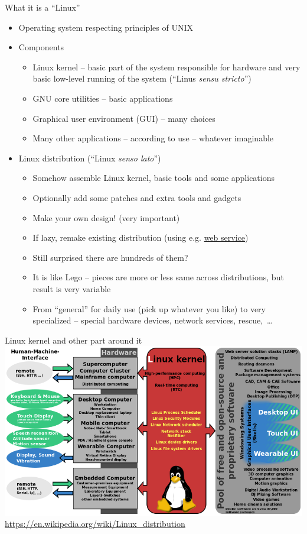 \documentclass[compress, ucs, xelatex, 11pt, xcolor=svgnames,
  hyperref={
    bookmarks=true,
    unicode=true,
    colorlinks=true,
    pdftitle={Linux, command line and MetaCentrum},
    plainpages=false,
    pdfauthor={Vojtech Zeisek},
    pdfsubject={Course about use of Linux command line, writing shell scripts and using MetaCentrum of CESNET},
    pdfcreator={XeLaTeX},
    pdfkeywords={Linux, GNU, BASH, shell, command line, MetaCentrum},
    linkcolor=DarkRed,
    anchorcolor=DarkBlue,
    citecolor=Indigo,
    filecolor=NavyBlue,
    menucolor=DarkMagenta,
    urlcolor=DarkBlue,
    pdftex},
  url={hyphens, lowtilde} %
  ]{beamer}
\begin{document}
\begin{frame}{What it is a ``Linux''}
  \begin{itemize}
    \item Operating system respecting principles of UNIX
    \item Components
    \begin{itemize}
      \item Linux kernel -- basic part of the system responsible for hardware and very basic low-level running of the system (``Linus \textit{sensu stricto}'')
      \item GNU core utilities -- basic applications
      \item Graphical user environment (GUI) -- many choices
      \item Many other applications -- according to use -- whatever imaginable
    \end{itemize}
    \item Linux distribution (``Linux \textit{senso lato}'')
    \begin{itemize}
      \item Somehow assemble Linux kernel, basic tools and some applications
      \item Optionally add some patches and extra tools and gadgets
      \item Make your own design! (very important)
      \item If lazy, remake existing distribution (using e.g. \href{https://susestudio.com/}{web service})
      \item Still surprised there are hundreds of them?
      \item It is like Lego -- pieces are more or less same across distributions, but result is very variable
      \item From ``general'' for daily use (pick up whatever you like) to very specialized -- special hardware devices, network services, rescue,~\ldots
    \end{itemize}
  \end{itemize}
\end{frame}

\begin{frame}{Linux kernel and other part around it}
  \includegraphics[width=\textwidth]{linux_kernel_ubiquity.png}
  \vfil
  \url{https://en.wikipedia.org/wiki/Linux_distribution}
  \vfill
\end{frame}
\end{document}
